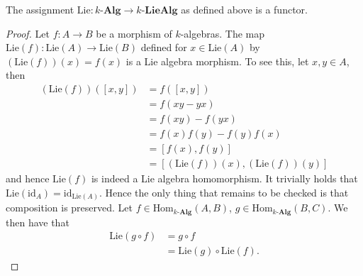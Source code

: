 \begin{lemma}
  \label{lem:functoriality}
  The assignment $ \text{Lie}:k\text{-}\mathbf{Alg} \to k\text{-}\mathbf{LieAlg} $ as defined above is a functor.
\end{lemma}
\begin{proof}
  Let $ f: A \to B $ be a morphism of $ k $-algebras. The map $ \text{Lie}(f):\text{Lie}(A) \to \text{Lie}(B) $ defined for $ x \in \text{Lie}(A) $ by $ (\text{Lie}(f))(x)=f(x) $ is a Lie algebra morphism. To see this, let $ x,y \in A $, then
  \begin{align*}
    (\text{Lie}(f))([x,y]) &= f([x,y]) \\
                           &= f(xy - yx) \\
                           &= f(xy) - f(yx) \\
                           &= f(x)f(y) - f(y)f(x) \\
                           &= [f(x), f(y)] \\
                           &= [(\text{Lie}(f))(x), (\text{Lie}(f))(y)]
  \end{align*}
  and hence $ \text{Lie}(f) $ is indeed a Lie algebra homomorphism. It trivially holds that $ \text{Lie}(\text{id}_A) = \text{id}_{\text{Lie}(A)} $. Hence the only thing that remains to be checked is that composition is preserved. Let $ f \in \text{Hom}_{k\text{-}\mathbf{Alg}}(A,B) $, $ g \in \text{Hom}_{k\text{-}\mathbf{Alg}}(B,C) $. We then have that
  \begin{align*}
    \text{Lie}(g \circ f) &= g \circ f \\
                          &= \text{Lie}(g) \circ \text{Lie}(f)
  .\end{align*}
\end{proof}

